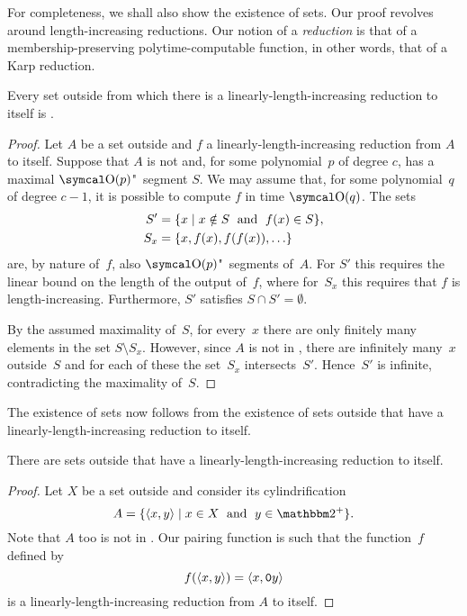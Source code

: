 For completeness, we shall also show the existence of  sets.
Our proof revolves around length-increasing reductions.
Our notion of a \emph{reduction} is that of a membership-preserving polytime-computable function, in other words, that of a Karp reduction.
\begin{theorem}
  Every set outside  from which there is a linearly-length-increasing reduction to itself is .
\end{theorem}
\begin{proof}
  Let $A$ be a set outside  and $f$ a linearly-length-increasing reduction from $A$ to itself.
  Suppose that $A$ is not  and, for some polynomial~$p$ of degree $c$, has a maximal $\bigO(p)$"~segment $S$.
  We may assume that, for some polynomial~$q$ of degree $c - 1$, it is possible to compute $f$ in time $\bigO(q)$.
  The sets
  \begin{align*}
    S' &= \{x \;|\; x \notin S \;\text{ and }\; f(x) \in S\}, \\
    S_x &= \{x, f(x), f(f(x)), \ldots\}
  \end{align*}
  are, by nature of~$f$, also $\bigO(p)$"~segments of~$A$.
  For $S'$ this requires the linear bound on the length of the output of~$f$, where for~$S_x$ this requires that $f$ is length-increasing.
  Furthermore, $S'$ satisfies $S \cap S' = \emptyset$.

  By the assumed maximality of~$S$, for every~$x$ there are only finitely many elements in the set $S \setminus S_x$.
  However, since $A$ is not in , there are infinitely many~$x$ outside~$S$ and for each of these the set~$S_x$ intersects~$S'$.
  Hence~$S'$ is infinite, contradicting the maximality of~$S$.
\end{proof}

The existence of  sets now follows from the existence of sets outside  that have a linearly-length-increasing reduction to itself.
\begin{lemma}
  There are sets outside  that have a linearly-length-increasing reduction to itself.
\end{lemma}
\begin{proof}
  Let $X$ be a set outside  and consider its cylindrification \parencite[see][Section~5.3]{balcazar1990structural}
  \begin{equation*}
    A \deq \{\pair{x}{y} \st x \in X \reland y \in \binary^+\}.
  \end{equation*}
  Note that $A$ too is not in .
  Our pairing function is such that the function~$f$ defined by
  \begin{equation*}
    f({\langle x, y\rangle}) = {\langle x, \textnormal{\texttt{0}}y\rangle}
  \end{equation*}
  is a linearly-length-increasing reduction from $A$ to itself.
\end{proof}

